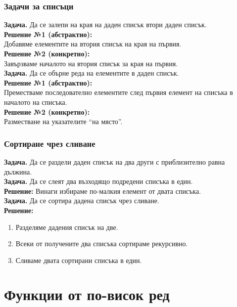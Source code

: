 \documentclass[alsotrans]{beamerswitch}
\begin{document}
\begin{frame}
  \frametitle{Задачи за списъци}

  \textbf{Задача.} Да се залепи на края на даден списък втори даден списък.\\[2ex]
  \pause
  \textbf{Решение №1 (абстрактно):} \\
  Добавяме елементите на втория списък на края на първия.\\[2ex]
  \pause
  \textbf{Решение №2 (конкретно):} \\
  Завързваме началото на втория списък за края на първия.\\[2ex]
  \pause\pause
  \textbf{Задача.} Да се обърне реда на елементите в даден списък.\\[2ex]
  \pause
  \textbf{Решение №1 (абстрактно):}\\
  Преместваме последователно елементите след първия елемент на списъка в началото на списъка.\\[2ex]
  \pause
  \textbf{Решение №2 (конкретно):}\\
  Разместване на указателите ``на място''.
\end{frame}

\begin{frame}
  \frametitle{Сортиране чрез сливане}

  \textbf{Задача.} Да се раздели даден списък на два други с приблизително равна дължина.\\[2ex]
  \pause
  \textbf{Задача.} Да се слеят два възходящо подредени списъка в един.\\
  \pause
  \textbf{Решение:} Винаги избираме по-малкия елемент от двата списъка.\\[2ex]
  \pause
  \textbf{Задача.} Да се сортира дадена списък чрез сливане.\\
  \pause
  \textbf{Решение:}
  \begin{enumerate}
  \item Разделяме дадения списък на две.
  \item Всеки от получените два списъка сортираме рекурсивно.
  \item Сливаме двата сортирани списъка в един.
  \end{enumerate}
\end{frame}

\section{Функции от по-висок ред}
\end{document}
